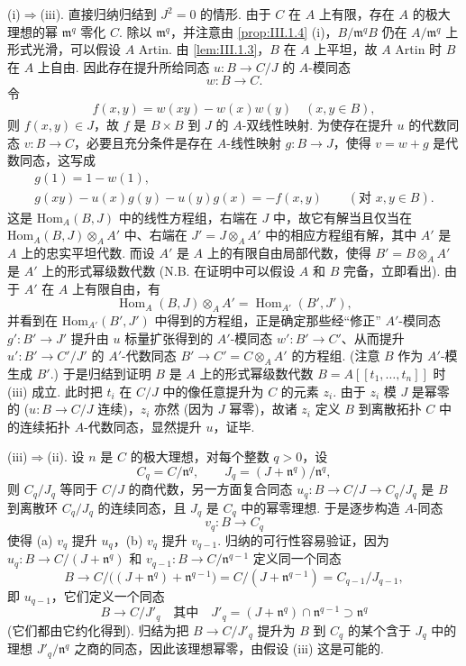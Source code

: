 (i)$\Rightarrow$(iii). 直接归纳归结到 $J^2 = 0$ 的情形. 由于 $C$ 在 $A$ 上有限，存在 $A$ 的极大理想的幂 $\mathfrak{m}^q$ 零化 $C$. 除以 $\mathfrak{m}^q$，并注意由 \ref{prop:III.1.4} (i)，$B/\mathfrak{m}^q B$ 仍在 $A/\mathfrak{m}^q$ 上形式光滑，可以假设 $A$ Artin. 由 \ref{lem:III.1.3}，$B$ 在 $A$ 上平坦，故 $A$ Artin 时 $B$ 在 $A$ 上自由. 因此存在提升所给同态 $u \colon B \to C/J$ 的 $A$-模同态
\[
w \colon B \longrightarrow C.
\]
令
\[
f(x, y) = w(xy) - w(x)w(y) \quad (x, y \in B),
\]
则 $f(x, y) \in J$，故 $f$ 是 $B \times B$ 到 $J$ 的 $A$-双线性映射. 为使存在提升 $u$ 的代数同态 $v \colon B \to C$，必要且充分条件是存在 $A$-线性映射 $g \colon B \to J$，使得 $v = w + g$ 是代数同态，这写成
\[
\begin{array}{c}
g(1) = 1 - w(1), \\
g(xy) - u(x)g(y) - u(y)g(x) = -f(x, y) \qquad (\text{对 } x, y \in B).
\end{array}
\]
这是 $\mathrm{Hom}_A(B, J)$ 中的线性方程组，右端在 $J$ 中，故它有解当且仅当在 $\mathrm{Hom}_{A}(B, J) \otimes_A A'$ 中、右端在 $J' = J \otimes_A A'$ 中的相应方程组有解，其中 $A'$ 是 $A$ 上的忠实平坦代数. 而设 $A'$ 是 $A$ 上的有限自由局部代数，使得 $B' = B \otimes_A A'$ 是 $A'$ 上的形式幂级数代数 (N.B. 在证明中可以假设 $A$ 和 $B$ 完备，立即看出). 由于 $A'$ 在 $A$ 上有限自由，有
\[
\operatorname{Hom}_{A}(B, J) \otimes_A A' = \operatorname{Hom}_{A'}(B', J'),
\]
并看到在 $\mathrm{Hom}_{A'}(B', J')$ 中得到的方程组，正是确定那些经``修正'' $A'$-模同态 $g' \colon B' \to J'$ 提升由 $u$ 标量扩张得到的 $A'$-模同态 $w' \colon B' \to C'$、从而提升 $u' \colon B' \to C'/J'$ 的 $A'$-代数同态 $B' \to C' = C \otimes_A A'$ 的方程组. (注意 $B$ 作为 $A'$-模生成 $B'$.) 于是归结到证明 $B$ 是 $A$ 上的形式幂级数代数 $B = A[\![t_1, \dots, t_n]\!]$ 时 (iii) 成立. 此时把 $t_i$ 在 $C/J$ 中的像任意提升为 $C$ 的元素 $z_i$. 由于 $z_i$ 模 $J$ 是幂零的 ($u \colon B \to C/J$ 连续)，$z_i$ 亦然 (因为 $J$ 幂零)，故诸 $z_i$ 定义 $B$ 到离散拓扑 $C$ 中的连续拓扑 $A$-代数同态，显然提升 $u$，证毕.

(iii)$\Rightarrow$(ii). 设 $n$ 是 $C$ 的极大理想，对每个整数 $q > 0$，设
\[
C_q = C/\mathfrak{n}^q, \qquad J_q = (J + \mathfrak{n}^q)/\mathfrak{n}^q,
\]
则 $C_q/J_q$ 等同于 $C/J$ 的商代数，另一方面复合同态 $u_q \colon B \to C/J \to C_q/J_q$ 是 $B$ 到离散环 $C_q/J_q$ 的连续同态，且 $J_q$ 是 $C_q$ 中的幂零理想. 于是逐步构造 $A$-同态
\[
v_q \colon B \longrightarrow C_q
\]
使得 (a) $v_q$ 提升 $u_q$，(b) $v_q$ 提升 $v_{q-1}$. 归纳的可行性容易验证，因为 $u_q \colon B \to C/(J + \mathfrak{n}^q)$ 和 $v_{q-1} \colon B \to C/\mathfrak{n}^{q-1}$ 定义同一个同态
\[
B \longrightarrow C/\bigl((J + \mathfrak{n}^q) + \mathfrak{n}^{q-1}\bigr) = C/(J + \mathfrak{n}^{q-1}) = C_{q-1}/J_{q-1},
\]
即 $u_{q-1}$，它们定义一个同态
\[
B \longrightarrow C/J'_q \quad \text{其中} \quad J'_q = (J + \mathfrak{n}^q) \cap \mathfrak{n}^{q-1} \supset \mathfrak{n}^q
\]
(它们都由它约化得到). 归结为把 $B \to C/J'_q$ 提升为 $B$ 到 $C_q$ 的某个含于 $J_q$ 中的理想 $J'_q/\mathfrak{n}^q$ 之商的同态，因此该理想幂零，由假设 (iii) 这是可能的.

